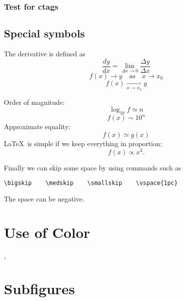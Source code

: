 \documentclass[12pt]{article}
\begin{document}
\subsubsection{Test for ctags}
\subsection{Special symbols}

The derivative is defined as
\begin{equation}
\frac{dy}{dx} = \lim_{\Delta x \to 0} \frac{\Delta y}
{\Delta x}
\end{equation}
\begin{equation}
f(x) \to y \quad \mbox{as} \quad x \to
x_{0}
\end{equation}
\begin{equation}
f(x) \mathop {\longrightarrow}
\limits_{x \to x_0} y
\end{equation}

\noindent Order of magnitude:
\begin{equation}
\log_{10}f \simeq n
\end{equation}
\begin{equation}
f(x)\sim 10^{n}
\end{equation}
Approximate equality:
\begin{equation}
f(x)\simeq g(x)
\end{equation}
\LaTeX\ is simple if we keep everything in proportion:
\begin{equation}
f(x) \propto x^3 .
\end{equation}

Finally we can skip some space by using commands such as
\begin{verbatim}
\bigskip    \medskip    \smallskip    \vspace{1pc}
\end{verbatim}
The space can be negative.

\section{\color{red}Use of Color}

{\color{blue}{We can change colors for emphasis}},
{\color{green}{but}} {\color{cyan}{who is going pay for the ink?}}

\section{\label{morefig}Subfigures}
\end{document}
